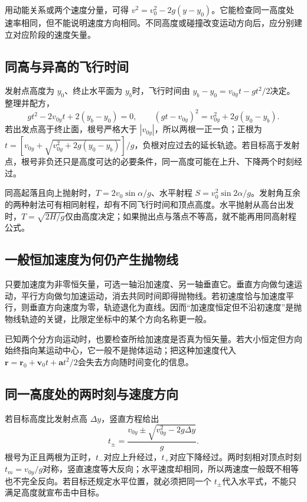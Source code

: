 用动能关系或两个速度分量，可得 $v^2=v_0^2-2g(y-y_0)$。它能检查同一高度处速率相同，但不能说明速度方向相同。不同高度或碰撞改变运动方向后，应分别建立对应阶段的速度矢量。

\subsection{同高与异高的飞行时间}
发射点高度为 $y_0$、终止水平面为 $y_b$时，飞行时间由 $y_b-y_0=v_{0y}t-gt^2/2$决定。整理并配方，
\[
 gt^2-2v_{0y}t+2(y_b-y_0)=0,
 \qquad (gt-v_{0y})^2=v_{0y}^2+2g(y_0-y_b).
\]
若出发点高于终止面，根号严格大于 $|v_{0y}|$，所以两根一正一负；正根为 $t=[v_{0y}+\sqrt{v_{0y}^2+2g(y_0-y_b)}]/g$，负根对应过去的延长轨迹。若目标高于发射点，根号非负还只是高度可达的必要条件，同一高度可能在上升、下降两个时刻经过。

同高起落且向上抛射时，$T=2v_0\sin\alpha/g$、水平射程 $S=v_0^2\sin2\alpha/g$。发射角互余的两种射法可有相同射程，却有不同飞行时间和顶点高度。水平抛射从高台出发时，$T=\sqrt{2H/g}$仅由高度决定；如果抛出点与落点不等高，就不能再用同高射程公式。

\subsection{一般恒加速度为何仍产生抛物线}
只要加速度为非零恒矢量，可选一轴沿加速度、另一轴垂直它。垂直方向做匀速运动，平行方向做匀加速运动，消去共同时间即得抛物线。若初速度恰与加速度平行，则垂直方向速度为零，轨迹退化为直线。因而“加速度恒定但不沿初速度”是抛物线轨迹的关键，比限定坐标中的某个方向名称更一般。

已知两个分方向运动时，也要检查所给加速度是否真为恒矢量。若大小恒定但方向始终指向某运动中心，它一般不是抛体运动；把这种加速度代入 $\bm r=\bm r_0+\bm v_0t+\bm at^2/2$会失去方向随时间变化的信息。

\subsection{同一高度处的两时刻与速度方向}
若目标高度比发射点高 $\Delta y$，竖直方程给出
\[t_\pm=\frac{v_{0y}\pm\sqrt{v_{0y}^2-2g\Delta y}}{g}.\]
根号为正且两根为正时，$t_-$对应上升经过，$t_+$对应下降经过。两时刻相对顶点时刻 $t_m=v_{0y}/g$对称，竖直速度等大反向；水平速度却相同，所以两速度一般既不相等也不完全反向。若目标还规定水平位置，就必须把同一个 $t_\pm$代入水平式，不能只满足高度就宣布击中目标。

